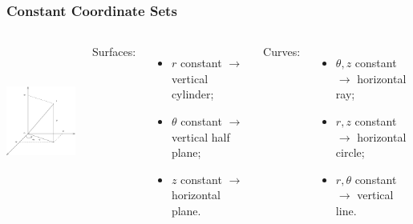 \begin{frame}
\frametitle{Constant Coordinate Sets}
\begin{columns}
  \includegraphics[height=2in]{../../modules/coordinate-systems/pictures/cylindrical_coordinates.eps}

Surfaces:
\begin{itemize}
  \item $r$ constant \pause$\to$ vertical cylinder;
  \item $\theta$ constant \pause$\to$ vertical half plane;
  \item $z$ constant \pause$\to$ horizontal plane.\pause
\end{itemize}
%
Curves:
\begin{itemize}
 \item $\theta, z$ constant \pause$\to$ horizontal ray;
\item $r, z$ constant \pause$\to$ horizontal circle;
\item $r, \theta$ constant \pause$\to$ vertical line.
\end{itemize}
\end{columns}
\end{frame}